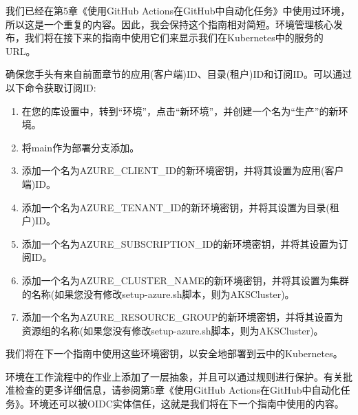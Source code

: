 我们已经在第5章《使用GitHub Actions在GitHub中自动化任务》中使用过环境，所以这是一个重复的内容。因此，我会保持这个指南相对简短。环境管理核心发布，我们将在接下来的指南中使用它们来显示我们在Kubernetes中的服务的URL。


确保您手头有来自前面章节的应用(客户端)ID、目录(租户)ID和订阅ID。可以通过以下命令获取订阅ID:



\begin{enumerate}
\item 
在您的库设置中，转到“环境”，点击“新环境”，并创建一个名为“生产”的新环境。

\item 
将main作为部署分支添加。

\item 
添加一个名为AZURE\_CLIENT\_ID的新环境密钥，并将其设置为应用(客户端)ID。

\item 
添加一个名为AZURE\_TENANT\_ID的新环境密钥，并将其设置为目录(租户)ID。

\item 
添加一个名为AZURE\_SUBSCRIPTION\_ID的新环境密钥，并将其设置为订阅ID。

\item 
添加一个名为AZURE\_CLUSTER\_NAME的新环境密钥，并将其设置为集群的名称(如果您没有修改setup-azure.sh脚本，则为AKSCluster)。

\item 
添加一个名为AZURE\_RESOURCE\_GROUP的新环境密钥，并将其设置为资源组的名称(如果您没有修改setup-azure.sh脚本，则为AKSCluster)。
\end{enumerate}

我们将在下一个指南中使用这些环境密钥，以安全地部署到云中的Kubernetes。


环境在工作流程中的作业上添加了一层抽象，并且可以通过规则进行保护。有关批准检查的更多详细信息，请参阅第5章《使用GitHub Actions在GitHub中自动化任务》。环境还可以被OIDC实体信任，这就是我们将在下一个指南中使用的内容。
